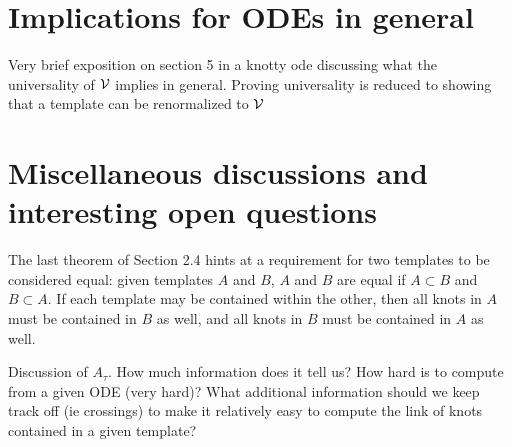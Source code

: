 \documentclass[paper.tex]{subfiles}
\begin{document}
\section{Implications for ODEs in general}

Very brief exposition on section 5 in a knotty ode discussing what the universality of $\mathcal{V}$ implies in general. Proving universality is reduced to showing that a template can be renormalized to $\mathcal{V}$


\section{Miscellaneous discussions and interesting open questions}
\label{sec:misc}

The last theorem of Section 2.4 hints at a requirement for two templates to be considered equal: given templates $A$ and $B$, $A$ and $B$ are equal if $A \subset B$ and $B \subset A$. If each template may be contained within the other, then all knots in $A$ must be contained in $B$ as well, and all knots in $B$ must be contained in $A$ as well.

Discussion of $A_\tau$. How much information does it tell us? How hard is to compute from a given ODE (very hard)? What additional information should we keep track off (ie crossings) to make it relatively easy to compute
the link of knots contained in a given template?
\end{document}
